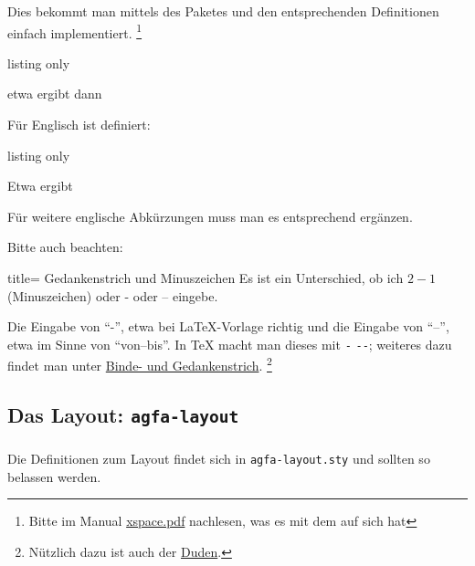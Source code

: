 Dies bekommt man mittels des Paketes  und den entsprechenden Definitionen einfach implementiert.%
\footnote{Bitte im Manual \href{https://mirror.informatik.hs-fulda.de/tex-archive/macros/latex/required/tools/xspace.pdf}{xspace.pdf} nachlesen, was es mit dem  auf sich hat} 
%
\begin{tcblisting}{listing only}
\renewcommand{\dh}{d.\,h.\xspace}
\newcommand{\ua}{u.\,a.\xspace}
\newcommand{\zB}{z.\,B.\xspace}
\newcommand{\og}{o.\,g.\xspace}
\newcommand{\etc}{etc.\xspace}
\newcommand{\bzw}{bzw.\xspace}
\newcommand{\inkl}{inkl.\xspace}
\newcommand{\ia}{i.\,A.\xspace}
\end{tcblisting}
%
etwa ergibt  dann \ua

Für Englisch ist definiert:
%
\begin{tcblisting}{listing only}
\renewcommand{\eg}{e.g.\xspace}
\newcommand{\ie}{i.e.\xspace}
\end{tcblisting}
%
Etwa  ergibt \eg 

Für weitere englische Abkürzungen muss man es entsprechend ergänzen.

Bitte auch beachten: 
\begin{tcblisting}{title= Gedankenstrich und Minuszeichen}
Es ist ein Unterschied, ob ich $ 2 - 1 $ (Minuszeichen) oder - oder -- eingebe.
\end{tcblisting}
Die Eingabe von \enquote{-}, etwa bei \LaTeX{}-Vorlage richtig und die Eingabe von \enquote{--}, etwa im Sinne von  \enquote{von--bis}.
In \TeX{} macht man dieses mit \verb+-+ \bzw \verb+--+; weiteres dazu findet man unter \href{https://typefacts.com/artikel/binde-und-gedankenstrich}{Binde- und Gedankenstrich}.%
\footnote{Nützlich dazu ist auch der \href{https://de.wikipedia.org/wiki/Duden}{Duden}.}
%
\subsection{Das Layout: \texttt{agfa-layout}}\label{subsec:agfa-layout}
\subsubsection{}\label{subsubsec:test}
Die Definitionen zum Layout findet sich in \texttt{agfa-layout.sty} und sollten so belassen werden.

